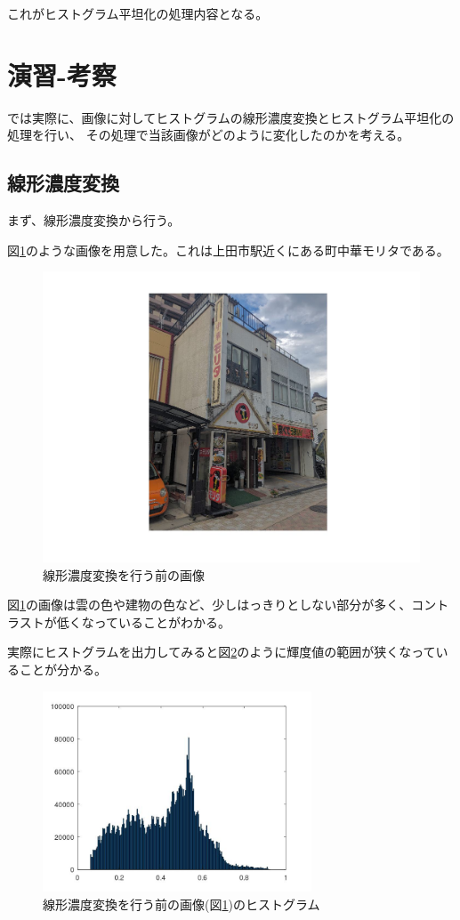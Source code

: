 \documentclass[a4paper,11pt,dvipdfmx]{jsarticle}
\begin{document}
これがヒストグラム平坦化の処理内容となる。

\section{演習-考察}
では実際に、画像に対してヒストグラムの線形濃度変換とヒストグラム平坦化の処理を行い、
その処理で当該画像がどのように変化したのかを考える。

\subsection{線形濃度変換}
まず、線形濃度変換から行う。

図\ref{Morita}のような画像を用意した。これは上田市駅近くにある町中華モリタである。
\begin{figure}[htbp]
    \centering
    \includegraphics[width=120mm]{./img/linear_beforeimg.jpg}
    \caption{線形濃度変換を行う前の画像}
    \label{Morita}
\end{figure}

図\ref{Morita}の画像は雲の色や建物の色など、少しはっきりとしない部分が多く、コントラストが低くなっていることがわかる。

\newpage
実際にヒストグラムを出力してみると図\ref{bfhist}のように輝度値の範囲が狭くなっていることが分かる。
\begin{figure}[htbp]
    \centering
    \includegraphics[width=80mm]{./img/linear_beforefunc.jpg}
    \caption{線形濃度変換を行う前の画像(図\ref{Morita})のヒストグラム}
    \label{bfhist}
\end{figure}
\end{document}
